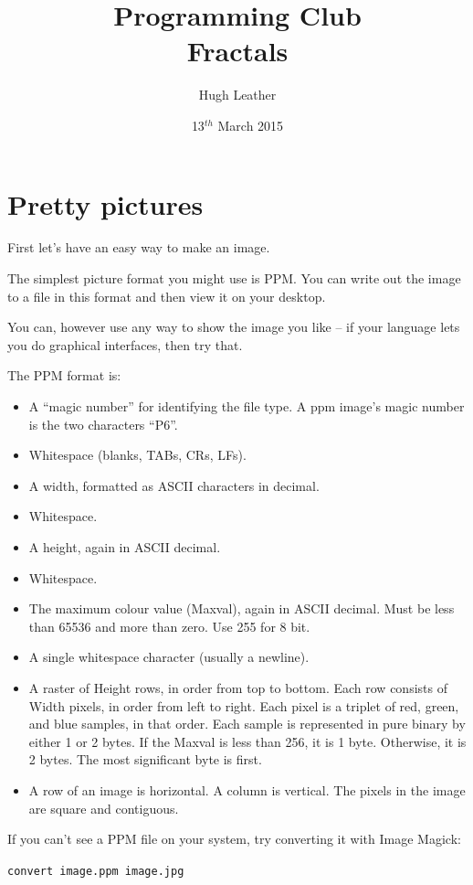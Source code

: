 \documentclass{article}
\title{
    \textbf{Programming Club}\\
    Fractals
}
\author{Hugh Leather}
\date{13$^{th}$ March 2015}
\begin{document}
    \maketitle
    
    \section{Pretty pictures}
        First let's have an easy way to make an image.  

        The simplest picture format you might use is PPM.  You can write out the image to a file in this format and then view it on your 
        desktop.
        
        You can, however use any way to show the image you like -- if your language lets you do graphical interfaces, then try that.
        
        The PPM format is:
        \begin{itemize}
            \item A ``magic number'' for identifying the file type. A ppm image's magic number is the two characters ``P6''.
            \item Whitespace (blanks, TABs, CRs, LFs).
            \item A width, formatted as ASCII characters in decimal.
            \item Whitespace.
            \item A height, again in ASCII decimal.
            \item Whitespace.
            \item The maximum colour value (Maxval), again in ASCII decimal. Must be less than 65536 and more than zero. Use 255 for 8 bit.
            \item A single whitespace character (usually a newline).
            \item A raster of Height rows, in order from top to bottom. Each row consists of Width pixels, in order from left to right.
            Each pixel is a triplet of red, green, and blue samples, in that order. Each sample is represented in pure binary by either 1
            or 2 bytes. If the Maxval is less than 256, it is 1 byte. Otherwise, it is 2 bytes. The most significant byte is first.
            \item A row of an image is horizontal. A column is vertical. The pixels in the image are square and contiguous.
        \end{itemize}

        If you can't see a PPM file on your system, try converting it with Image Magick:
        \begin{centering}
            \texttt{convert image.ppm image.jpg}
        \end{centering}
        
\end{document}
